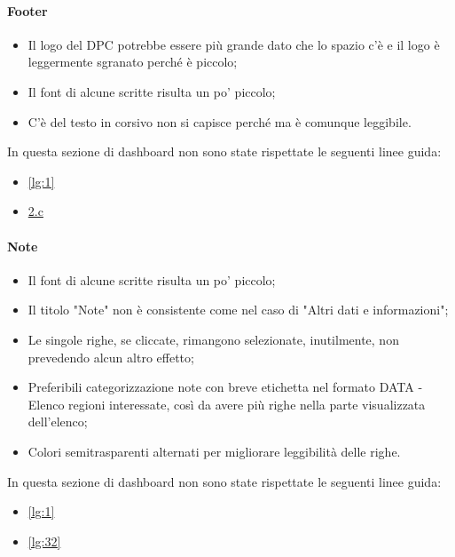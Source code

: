 \paragraph{Footer}
\begin{itemize}
    \item Il logo del DPC potrebbe essere più grande dato che lo spazio c'è e il logo è leggermente sgranato perché è piccolo;
    \item Il font di alcune scritte risulta un po' piccolo;
    \item C'è del testo in corsivo non si capisce perché ma è comunque leggibile.
\end{itemize}
In questa sezione di dashboard non sono state rispettate le seguenti linee guida:
\begin{itemize}
    \item \ref{lg:1}
    \item \hyperref[lg:2.c]{2.c}
\end{itemize}

\paragraph{Note}
\begin{itemize}
    \item Il font di alcune scritte risulta un po' piccolo;
    \item Il titolo "Note" non è consistente come nel caso di "Altri dati e informazioni";
    \item Le singole righe, se cliccate, rimangono selezionate, inutilmente, non prevedendo alcun altro effetto;
    \item Preferibili categorizzazione note con breve etichetta nel formato DATA - Elenco regioni interessate, così da avere più righe nella parte visualizzata dell'elenco;
    \item Colori semitrasparenti alternati per migliorare leggibilità delle righe.
\end{itemize}
In questa sezione di dashboard non sono state rispettate le seguenti linee guida:
\begin{itemize}
    \item \ref{lg:1}
    \item \ref{lg:32}
\end{itemize}

